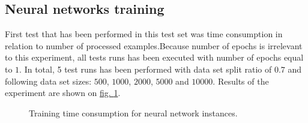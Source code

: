 \subsection{Neural networks training}\label{sec:neural-network-training}
First test that has been performed in this test set was time consumption in relation to number of processed examples.Because number of epochs is irrelevant to this experiment, all tests runs has been executed with number of epochs equal to $1$. In total, 5 test runs has been performed with data set split ratio of $0.7$ and following data set sizes: $500$, $1000$, $2000$, $5000$ and $10000$. Results of the experiment are shown on \hyperref[fig:training-time-consumpption]{fig. \ref*{fig:training-time-consumpption}}.
\begin{figure}
\centering
{}
\caption{Training time consumption for neural network instances.}
\label{fig:training-time-consumpption}
\end{figure}
